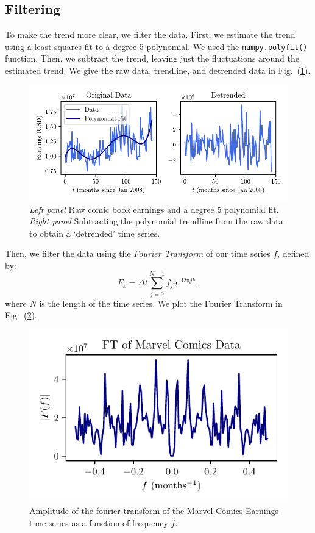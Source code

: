 \documentclass[12pt]{article}
\newcommand{\I}{\mathrm i}
\newcommand{\e}{\mathrm e}
\begin{document}
\subsection{Filtering}
\label{sec:filtering}
To make the trend more clear, we filter the data.  First, we estimate the trend using a least-squares fit to a degree 5 polynomial.  We used the \texttt{numpy.polyfit()} function.  Then, we subtract the trend, leaving just the fluctuations around the estimated trend.  We give the raw data, trendline, and detrended data in Fig.~(\ref{fig:detrended1}).
\begin{figure}[ht]
    \centering
    \includegraphics{figures/detrended1.pdf}
    \caption{\textit{Left panel} Raw comic book earnings and a degree 5 polynomial fit.  \textit{Right panel} Subtracting the polynomial trendline from the raw data to obtain a `detrended' time series.}\label{fig:detrended1}
\end{figure}
Then, we filter the data using the \textit{Fourier Transform} of our time series $f$, defined by:
\begin{equation}
    F_k = \Delta t \sum_{j=0}^{N-1}f_j \e^{-\I 2 \pi j k},
\end{equation}
where $N$ is the length of the time series.  We plot the Fourier Transform in Fig.~(\ref{fig:fourier}).
\begin{figure}[ht]
    \centering
    \includegraphics{figures/fourier.pdf}
    \caption{Amplitude of the fourier transform of the Marvel Comics Earnings time series as a function of frequency $f$.}\label{fig:fourier}
\end{figure}
\end{document}
